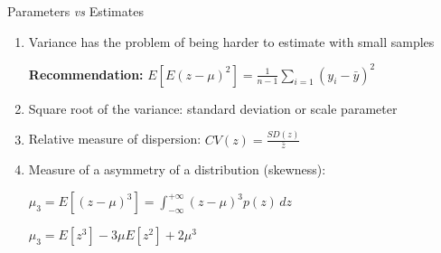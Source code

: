 \documentclass{beamer}
\begin{document}

\begin{frame}{Parameters \textit{vs} Estimates}
  \begin{enumerate}
  
  \item<1-> Variance has the problem of being harder to estimate with small samples
  
  \vspace{0.2cm}  
   
  \textbf{Recommendation:} $E\left[E(z-\mu)^2 \right] = \frac{1}{n-1} \sum\limits_{i=1}(y_{i} - \bar{y})^2$
  
  \vspace{0.2cm} 
  
  
  \item<2-> Square root of the variance: standard deviation or scale parameter 
  
  \vspace{0.2cm}   
  
  \item<3-> Relative measure of dispersion: $CV(z) = \frac{SD(z)}{\bar{z}}$
 
  \vspace{0.2cm} 
    
  
  \item<4-> Measure of a asymmetry of a distribution (skewness):
  
  \vspace{0.2cm} 
  
  $\mu_{3} = E\left[(z-\mu)^3 \right] =  \int_{-\infty}^{+\infty} (z - \mu)^{3} p(z)\, dz$ 
  
  \vspace{0.2cm}
  
  $\mu_{3} = E\left[z^3 \right] - 3 \mu E\left[z^2 \right] + 2 \mu^3$
  
  \vspace{0.2cm}   
      
  \end{enumerate}
  
  
\end{frame}

\end{document}
